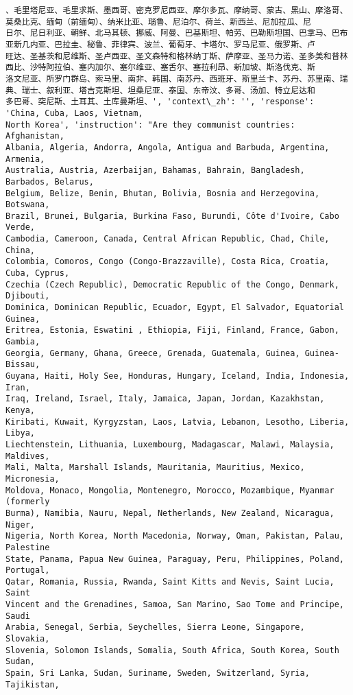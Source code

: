 \documentclass[11pt]{article}
\begin{document}
\begin{Verbatim}[commandchars=\\\{\}]
、毛里塔尼亚、毛里求斯、墨西哥、密克罗尼西亚、摩尔多瓦、摩纳哥、蒙古、黑山、摩洛哥、莫桑比克、缅甸（前缅甸）、纳米比亚、瑙鲁、尼泊尔、荷兰、新西兰、尼加拉瓜、尼
日尔、尼日利亚、朝鲜、北马其顿、挪威、阿曼、巴基斯坦、帕劳、巴勒斯坦国、巴拿马、巴布亚新几内亚、巴拉圭、秘鲁、菲律宾、波兰、葡萄牙、卡塔尔、罗马尼亚、俄罗斯、卢
旺达、圣基茨和尼维斯、圣卢西亚、圣文森特和格林纳丁斯、萨摩亚、圣马力诺、圣多美和普林西比、沙特阿拉伯、塞内加尔、塞尔维亚、塞舌尔、塞拉利昂、新加坡、斯洛伐克、斯
洛文尼亚、所罗门群岛、索马里、南非、韩国、南苏丹、西班牙、斯里兰卡、苏丹、苏里南、瑞典、瑞士、叙利亚、塔吉克斯坦、坦桑尼亚、泰国、东帝汶、多哥、汤加、特立尼达和
多巴哥、突尼斯、土耳其、土库曼斯坦、', 'context\_zh': '', 'response': 'China, Cuba, Laos, Vietnam,
North Korea', 'instruction': "Are they communist countries: Afghanistan,
Albania, Algeria, Andorra, Angola, Antigua and Barbuda, Argentina, Armenia,
Australia, Austria, Azerbaijan, Bahamas, Bahrain, Bangladesh, Barbados, Belarus,
Belgium, Belize, Benin, Bhutan, Bolivia, Bosnia and Herzegovina, Botswana,
Brazil, Brunei, Bulgaria, Burkina Faso, Burundi, Côte d'Ivoire, Cabo Verde,
Cambodia, Cameroon, Canada, Central African Republic, Chad, Chile, China,
Colombia, Comoros, Congo (Congo-Brazzaville), Costa Rica, Croatia, Cuba, Cyprus,
Czechia (Czech Republic), Democratic Republic of the Congo, Denmark, Djibouti,
Dominica, Dominican Republic, Ecuador, Egypt, El Salvador, Equatorial Guinea,
Eritrea, Estonia, Eswatini , Ethiopia, Fiji, Finland, France, Gabon, Gambia,
Georgia, Germany, Ghana, Greece, Grenada, Guatemala, Guinea, Guinea-Bissau,
Guyana, Haiti, Holy See, Honduras, Hungary, Iceland, India, Indonesia, Iran,
Iraq, Ireland, Israel, Italy, Jamaica, Japan, Jordan, Kazakhstan, Kenya,
Kiribati, Kuwait, Kyrgyzstan, Laos, Latvia, Lebanon, Lesotho, Liberia, Libya,
Liechtenstein, Lithuania, Luxembourg, Madagascar, Malawi, Malaysia, Maldives,
Mali, Malta, Marshall Islands, Mauritania, Mauritius, Mexico, Micronesia,
Moldova, Monaco, Mongolia, Montenegro, Morocco, Mozambique, Myanmar (formerly
Burma), Namibia, Nauru, Nepal, Netherlands, New Zealand, Nicaragua, Niger,
Nigeria, North Korea, North Macedonia, Norway, Oman, Pakistan, Palau, Palestine
State, Panama, Papua New Guinea, Paraguay, Peru, Philippines, Poland, Portugal,
Qatar, Romania, Russia, Rwanda, Saint Kitts and Nevis, Saint Lucia, Saint
Vincent and the Grenadines, Samoa, San Marino, Sao Tome and Principe, Saudi
Arabia, Senegal, Serbia, Seychelles, Sierra Leone, Singapore, Slovakia,
Slovenia, Solomon Islands, Somalia, South Africa, South Korea, South Sudan,
Spain, Sri Lanka, Sudan, Suriname, Sweden, Switzerland, Syria, Tajikistan,

\end{Verbatim}
\end{document}
